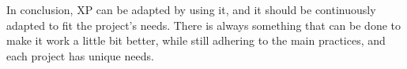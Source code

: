 In conclusion, XP can be adapted by using it, and it should be continuously adapted to fit the project's needs. 
There is always something that can be done to make it work a little bit better, while still adhering to the main practices, and each project has unique needs.




